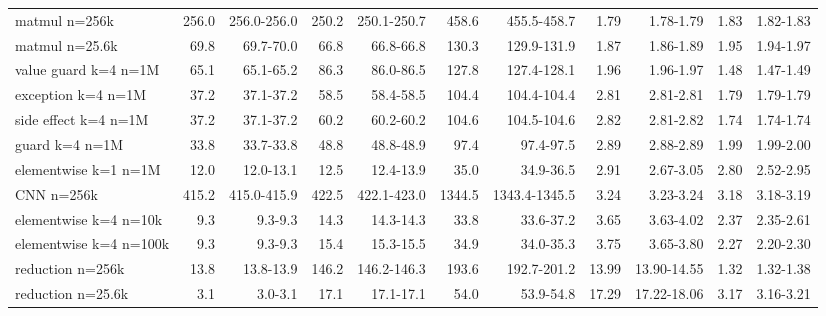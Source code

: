 \begin{tabular}{lrrrrrrrrrr}
matmul n=256k & 256.0 & 256.0-256.0 & 250.2 & 250.1-250.7 & 458.6 & 455.5-458.7 & 1.79 & 1.78-1.79 & 1.83 & 1.82-1.83 \\
matmul n=25.6k & 69.8 & 69.7-70.0 & 66.8 & 66.8-66.8 & 130.3 & 129.9-131.9 & 1.87 & 1.86-1.89 & 1.95 & 1.94-1.97 \\
value guard k=4 n=1M & 65.1 & 65.1-65.2 & 86.3 & 86.0-86.5 & 127.8 & 127.4-128.1 & 1.96 & 1.96-1.97 & 1.48 & 1.47-1.49 \\
exception k=4 n=1M & 37.2 & 37.1-37.2 & 58.5 & 58.4-58.5 & 104.4 & 104.4-104.4 & 2.81 & 2.81-2.81 & 1.79 & 1.79-1.79 \\
side effect k=4 n=1M & 37.2 & 37.1-37.2 & 60.2 & 60.2-60.2 & 104.6 & 104.5-104.6 & 2.82 & 2.81-2.82 & 1.74 & 1.74-1.74 \\
guard k=4 n=1M & 33.8 & 33.7-33.8 & 48.8 & 48.8-48.9 & 97.4 & 97.4-97.5 & 2.89 & 2.88-2.89 & 1.99 & 1.99-2.00 \\
elementwise k=1 n=1M & 12.0 & 12.0-13.1 & 12.5 & 12.4-13.9 & 35.0 & 34.9-36.5 & 2.91 & 2.67-3.05 & 2.80 & 2.52-2.95 \\
CNN n=256k & 415.2 & 415.0-415.9 & 422.5 & 422.1-423.0 & 1344.5 & 1343.4-1345.5 & 3.24 & 3.23-3.24 & 3.18 & 3.18-3.19 \\
elementwise k=4 n=10k & 9.3 & 9.3-9.3 & 14.3 & 14.3-14.3 & 33.8 & 33.6-37.2 & 3.65 & 3.63-4.02 & 2.37 & 2.35-2.61 \\
elementwise k=4 n=100k & 9.3 & 9.3-9.3 & 15.4 & 15.3-15.5 & 34.9 & 34.0-35.3 & 3.75 & 3.65-3.80 & 2.27 & 2.20-2.30 \\
reduction n=256k & 13.8 & 13.8-13.9 & 146.2 & 146.2-146.3 & 193.6 & 192.7-201.2 & 13.99 & 13.90-14.55 & 1.32 & 1.32-1.38 \\
reduction n=25.6k & 3.1 & 3.0-3.1 & 17.1 & 17.1-17.1 & 54.0 & 53.9-54.8 & 17.29 & 17.22-18.06 & 3.17 & 3.16-3.21 \\
\bottomrule
\end{tabular}
